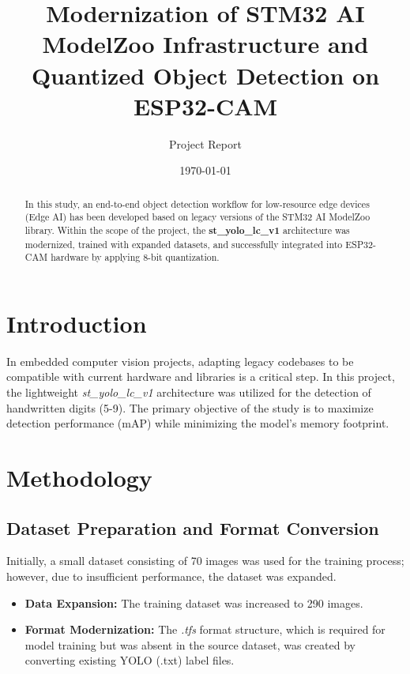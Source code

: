 \documentclass{article}
\title{Modernization of STM32 AI ModelZoo Infrastructure and Quantized Object Detection on ESP32-CAM}
\author{Project Report}
\date{\today}
\begin{document}
\maketitle

\begin{abstract}
In this study, an end-to-end object detection workflow for low-resource edge devices (Edge AI) has been developed based on legacy versions of the STM32 AI ModelZoo library. Within the scope of the project, the \textbf{st\_yolo\_lc\_v1} architecture was modernized, trained with expanded datasets, and successfully integrated into ESP32-CAM hardware by applying 8-bit quantization.
\end{abstract}

\section{Introduction}
In embedded computer vision projects, adapting legacy codebases to be compatible with current hardware and libraries is a critical step. In this project, the lightweight \textit{st\_yolo\_lc\_v1} architecture was utilized for the detection of handwritten digits (5-9). The primary objective of the study is to maximize detection performance (mAP) while minimizing the model's memory footprint.

\section{Methodology}

\subsection{Dataset Preparation and Format Conversion}
Initially, a small dataset consisting of 70 images was used for the training process; however, due to insufficient performance, the dataset was expanded.
\begin{itemize}
    \item \textbf{Data Expansion:} The training dataset was increased to 290 images.
    \item \textbf{Format Modernization:} The \textit{.tfs} format structure, which is required for model training but was absent in the source dataset, was created by converting existing YOLO (.txt) label files.
\end{itemize}
\end{document}
